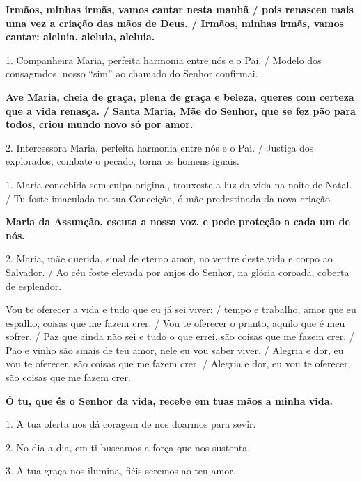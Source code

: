 \documentclass[a5paper,9pt]{extarticle}
\begin{document}
\begin{cantos}
\begin{canto}
\textbf{Irmãos, minhas irmãs, vamos cantar nesta manhã / pois renasceu mais uma vez a criação das mãos de Deus. / Irmãos, minhas irmãs, vamos cantar: aleluia, aleluia, aleluia.}
\end{canto}

\begin{canto}
1. Companheira Maria, perfeita harmonia entre nós e o Pai. / Modelo dos consagrados, nosso ``sim'' ao chamado do Senhor confirmai.

\textbf{Ave Maria, cheia de graça, plena de graça e beleza, queres com certeza que a vida renasça. / Santa Maria, Mãe do Senhor, que se fez pão para todos, criou mundo novo só por amor.}

2. Intercessora Maria, perfeita harmonia entre nós e o Pai. / Justiça dos explorados, combate o pecado, torna os homens iguais.
\end{canto}

\begin{canto}
1. Maria concebida sem culpa original, trouxeste a luz da vida na noite de Natal. / Tu foste imaculada na tua Conceição, ó mãe predestinada da nova criação.

\textbf{Maria da Assunção, escuta a nossa voz, e pede proteção a cada um de nós. }

2. Maria, mãe querida, sinal de eterno amor, no ventre deste vida e corpo ao Salvador. / Ao céu foste elevada por anjos do Senhor, na glória coroada, coberta de esplendor.
\end{canto}

\begin{canto}
Vou te oferecer a vida e tudo que eu já sei viver: / tempo e trabalho, amor que eu espalho, coisas que me fazem crer. / Vou te oferecer o pranto, aquilo que é meu sofrer. / Paz que ainda não sei e tudo o que errei, são coisas que me fazem crer. / Pão e vinho são sinais de teu amor, nele eu vou saber viver. / Alegria e dor, eu vou te oferecer, são coisas que me fazem crer. / Alegria e dor, eu vou te oferecer, são coisas que me fazem crer.
\end{canto}

\begin{canto}
\textbf{Ó tu, que és o Senhor da vida, recebe em tuas mãos a minha vida.}

1. A tua oferta nos dá coragem de nos doarmos para sevir.

2. No dia-a-dia, em ti buscamos a força que nos sustenta.

3. A tua graça nos ilumina, fiéis seremos ao teu amor.
\end{canto}


\end{cantos}
\end{document}
